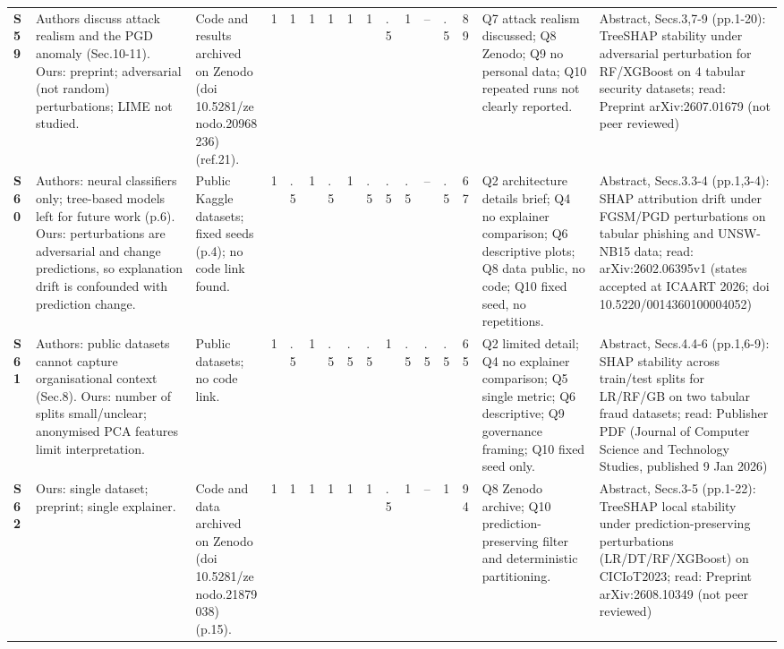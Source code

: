 \begin{longtable}{@{}P{1.0cm}P{4.6cm}P{3.6cm}P{0.3cm}P{0.3cm}P{0.3cm}P{0.3cm}P{0.3cm}P{0.3cm}P{0.3cm}P{0.3cm}P{0.3cm}P{0.36cm}P{0.75cm}P{3.0cm}P{3.9cm}@{}}
\textbf{S59} & Authors discuss attack realism and the PGD anomaly (Sec.10-11). Ours: preprint; adversarial (not random) perturbations; LIME not studied. & Code and results archived on Zenodo (doi 10.5281/\allowbreak{}zenodo.20968236) (ref.21). & 1 & 1 & 1 & 1 & 1 & 1 & .5 & 1 & -- & .5 & 89 & Q7 attack realism discussed; Q8 Zenodo; Q9 no personal data; Q10 repeated runs not clearly reported. & Abstract, Secs.3,7-9 (pp.1-20): TreeSHAP stability under adversarial perturbation for RF/\allowbreak{}XGBoost on 4 tabular security datasets; read: Preprint arXiv:2607.01679 (not peer reviewed) \\
\textbf{S60} & Authors: neural classifiers only; tree-based models left for future work (p.6). Ours: perturbations are adversarial and change predictions, so explanation drift is confounded with prediction change. & Public Kaggle datasets; fixed seeds (p.4); no code link found. & 1 & .5 & 1 & .5 & 1 & .5 & .5 & .5 & -- & .5 & 67 & Q2 architecture details brief; Q4 no explainer comparison; Q6 descriptive plots; Q8 data public, no code; Q10 fixed seed, no repetitions. & Abstract, Secs.3.3-4 (pp.1,3-4): SHAP attribution drift under FGSM/\allowbreak{}PGD perturbations on tabular phishing and UNSW-NB15 data; read: arXiv:2602.06395v1 (states accepted at ICAART 2026; doi 10.5220/\allowbreak{}0014360100004052) \\
\textbf{S61} & Authors: public datasets cannot capture organisational context (Sec.8). Ours: number of splits small/\allowbreak{}unclear; anonymised PCA features limit interpretation. & Public datasets; no code link. & 1 & .5 & 1 & .5 & .5 & .5 & 1 & .5 & .5 & .5 & 65 & Q2 limited detail; Q4 no explainer comparison; Q5 single metric; Q6 descriptive; Q9 governance framing; Q10 fixed seed only. & Abstract, Secs.4.4-6 (pp.1,6-9): SHAP stability across train/\allowbreak{}test splits for LR/\allowbreak{}RF/\allowbreak{}GB on two tabular fraud datasets; read: Publisher PDF (Journal of Computer Science and Technology Studies, published 9 Jan 2026) \\
\textbf{S62} & Ours: single dataset; preprint; single explainer. & Code and data archived on Zenodo (doi 10.5281/\allowbreak{}zenodo.21879038) (p.15). & 1 & 1 & 1 & 1 & 1 & 1 & .5 & 1 & -- & 1 & 94 & Q8 Zenodo archive; Q10 prediction-preserving filter and deterministic partitioning. & Abstract, Secs.3-5 (pp.1-22): TreeSHAP local stability under prediction-preserving perturbations (LR/\allowbreak{}DT/\allowbreak{}RF/\allowbreak{}XGBoost) on CICIoT2023; read: Preprint arXiv:2608.10349 (not peer reviewed) \\

\end{longtable}
